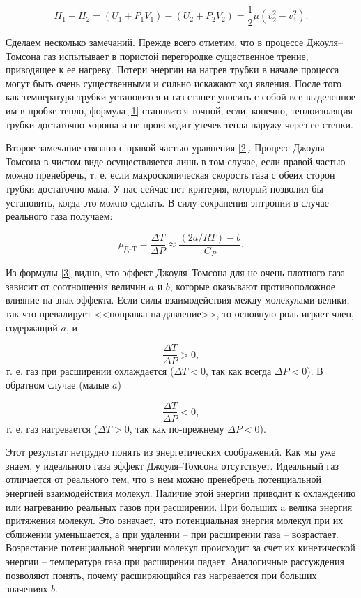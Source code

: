 \documentclass[a4paper,12pt]{article} %
\begin{document}
\begin{equation}\label{2}
H_1-H_2=\left(U_1+P_1V_1\right) - \left(U_2 + P_2V_2\right) = \frac{1}{2} \mu \left(v^2_2-v^2_1\right).
\end{equation}

Сделаем несколько замечаний. Прежде всего отметим, что в процессе Джоуля–Томсона газ испытывает в пористой перегородке существенное трение, приводящее к ее нагреву. Потери энергии на нагрев трубки в начале процесса могут быть очень существенными и сильно искажают ход явления. После того как температура трубки установится и газ станет уносить с собой все выделенное им в пробке тепло, формула \eqref{1} становится точной, если, конечно, теплоизоляция трубки достаточно хороша и не происходит утечек тепла наружу через ее стенки.

Второе замечание связано с правой частью уравнения \eqref{2}. Процесс Джоуля–Томсона в чистом виде осуществляется лишь в том случае, если правой частью можно пренебречь, т. е. если макроскопическая скорость газа с обеих сторон трубки достаточно мала. У нас сейчас нет критерия, который позволил бы установить, когда это можно сделать. В силу сохранения энтропии в случае реального газа получаем:

\begin{equation}\label{3}
\mu_\text{Д--Т} = \frac{\Delta T}{\Delta P} \approx \frac{(2a/RT) - b}{C_P}.
\end{equation}

Из формулы \eqref{3} видно, что эффект Джоуля–Томсона для не очень плотного газа зависит от соотношения величин $ a $ и $ b $, которые оказывают противоположное влияние на знак эффекта. Если силы взаимодействия между молекулами велики, так что превалирует <<поправка на давление>>, то основную роль играет член, содержащий $ a $, и 

\[ \frac{\Delta T}{\Delta P} > 0, \]
т. е. газ при расширении охлаждается ($ \Delta T < 0 $, так как всегда $ \Delta P < 0 $). В обратном случае (малые $ a $)

\[ \frac{\Delta T}{\Delta P} < 0, \]
т. е. газ нагревается ($ \Delta T > 0 $, так как по-прежнему $ \Delta P < 0 $).

Этот результат нетрудно понять из энергетических соображений. Как мы уже знаем, у идеального газа эффект Джоуля–Томсона отсутствует. Идеальный газ отличается от реального тем, что в нем можно пренебречь потенциальной энергией взаимодействия молекул. Наличие этой энергии приводит к охлаждению или нагреванию реальных газов при расширении. При больших a велика энергия притяжения молекул. Это означает, что потенциальная энергия молекул при их сближении уменьшается, а при удалении -- при расширении газа -- возрастает. Возрастание потенциальной энергии молекул происходит за счет их кинетической энергии -- температура газа при расширении падает. Аналогичные рассуждения позволяют понять, почему расширяющийся газ нагревается при больших значениях $ b $.
\end{document}
